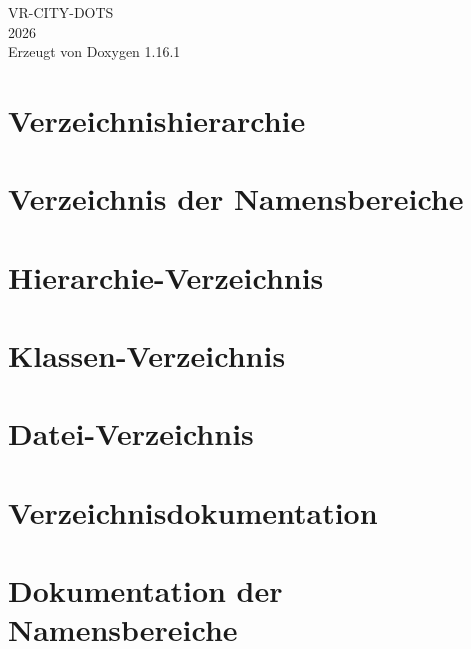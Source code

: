 \documentclass[twoside]{book}
\newcommand{\+}{\discretionary{\mbox{\scriptsize$\hookleftarrow$}}{}{}}
\newcommand{\clearemptydoublepage}{%
    \newpage{\pagestyle{empty}\cleardoublepage}%
  }
\begin{document}
  \raggedbottom
    \hypersetup{pageanchor=false,
                bookmarksnumbered=true,
                pdfencoding=unicode
               }
  \begin{titlepage}
  \vspace*{7cm}
  \begin{center}%
  {\Large VR-\/\+CITY-\/\+DOTS}\\
  [1ex]\large 2026 \\
  \vspace*{1cm}
  {\large Erzeugt von Doxygen 1.16.1}\\
  \end{center}
  \end{titlepage}
  \clearemptydoublepage
  \tableofcontents
  \clearemptydoublepage
  \hypersetup{pageanchor=true}

\chapter{Verzeichnishierarchie}

\chapter{Verzeichnis der Namensbereiche}

\chapter{Hierarchie-\/\+Verzeichnis}

\chapter{Klassen-\/\+Verzeichnis}

\chapter{Datei-\/\+Verzeichnis}

\chapter{Verzeichnisdokumentation}



\chapter{Dokumentation der Namensbereiche}



\end{document}
